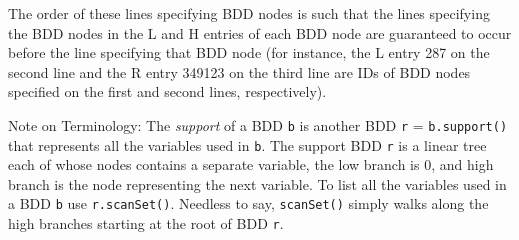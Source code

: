 The order of these lines specifying BDD nodes is such that the lines specifying the BDD nodes in the L and H entries
of each BDD node are guaranteed to occur before the line specifying that BDD node (for instance, the L entry 287 on
the second line and the R entry 349123 on the third line are IDs of BDD nodes specified on the first and second lines,
respectively).

Note on Terminology: 
The {\it support} of a BDD {\tt b} is another BDD {\tt r} = {\tt b.support()}
that represents all the variables used in {\tt b}.
The support BDD {\tt r} is a linear tree each of whose nodes contains a separate variable,
the low branch is 0, and high branch is the node representing the next variable.
To list all the variables used in a BDD {\tt b} use {\tt r.scanSet()}.
Needless to say, {\tt scanSet()} simply walks along the high branches
starting at the root of BDD {\tt r}.


